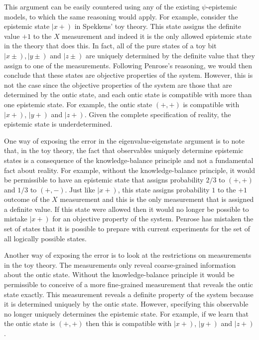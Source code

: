 \documentclass[DIV=calc,fontsize=12pt]{scrartcl} %
\theoremstyle{definition}
\theoremstyle{plain}
\newcommand{\RKet}[1]{\ensuremath{\left \vert #1 \right )}}
\begin{document}
This argument can be easily countered using any of the existing
$\psi$-epistemic models, to which the same reasoning would apply.  For
example, consider the epistemic state $\RKet{x+}$ in Spekkens' toy
theory.  This state assigns the definite value $+1$ to the $X$
measurement and indeed it is the only allowed epistemic state in the
theory that does this.  In fact, all of the pure states of a toy bit
$\RKet{x \pm}, \RKet{y \pm}$ and $\RKet{z \pm}$ are uniquely
determined by the definite value that they assign to one of the
measurements.  Following Penrose's reasoning, we would then conclude
that these states are objective properties of the system.  However,
this is not the case since the objective properties of the system are
those that are determined by the ontic state, and each ontic state is
compatible with more than one epistemic state.  For example, the ontic
state $(+,+)$ is compatible with $\RKet{x+}$, $\RKet{y+}$ and
$\RKet{z+}$.  Given the complete specification of reality, the
epistemic state is underdetermined.

One way of exposing the error in the eigenvalue-eigenstate argument is
to note that, in the toy theory, the fact that observables uniquely
determine epistemic states is a consequence of the knowledge-balance
principle and not a fundamental fact about reality.  For example,
without the knowledge-balance principle, it would be permissible to
have an epistemic state that assigns probability $2/3$ to $(+,+)$ and
$1/3$ to $(+,-)$.  Just like $\RKet{x+}$, this state assigns
probability $1$ to the $+1$ outcome of the $X$ measurement and this is
the only measurement that is assigned a definite value.  If this state
were allowed then it would no longer be possible to mistake
$\RKet{x+}$ for an objective property of the system.  Penrose has
mistaken the set of states that it is possible to prepare with current
experiments for the set of all logically possible states.

Another way of exposing the error is to look at the restrictions on
measurements in the toy theory.  The measurements only reveal
coarse-grained information about the ontic state.  Without the
knowledge-balance principle it would be permissible to conceive of a
more fine-grained measurement that reveals the ontic state exactly.
This measurement reveals a definite property of the system because it
is determined uniquely by the ontic state.  However, specifying this
observable no longer uniquely determines the epistemic state.  For
example, if we learn that the ontic state is $(+,+)$ then this is
compatible with $\RKet{x+}$, $\RKet{y+}$ and $\RKet{z+}$.
\end{document}

